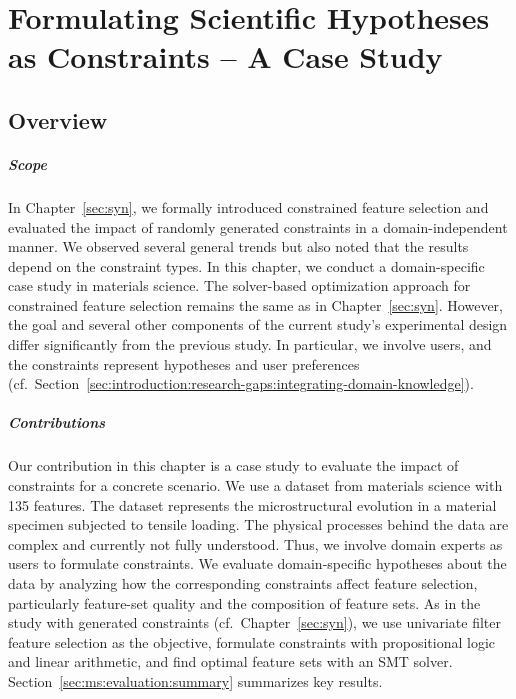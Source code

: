 \chapter{Formulating Scientific Hypotheses as Constraints -- A Case Study}
\label{sec:ms}

\section{Overview}
\label{sec:ms:overview}

\paragraph{Scope}

In Chapter~\ref{sec:syn}, we formally introduced constrained feature selection and evaluated the impact of randomly generated constraints in a domain-independent manner.
We observed several general trends but also noted that the results depend on the constraint types.
In this chapter, we conduct a domain-specific case study in materials science.
The solver-based optimization approach for constrained feature selection remains the same as in Chapter~\ref{sec:syn}.
However, the goal and several other components of the current study's experimental design differ significantly from the previous study.
In particular, we involve users, and the constraints represent hypotheses and user preferences (cf.~Section~\ref{sec:introduction:research-gaps:integrating-domain-knowledge}).

\paragraph{Contributions}

Our contribution in this chapter is a case study to evaluate the impact of constraints for a concrete scenario.
We use a dataset from materials science with 135 features.
The dataset represents the microstructural evolution in a material specimen subjected to tensile loading.
The physical processes behind the data are complex and currently not fully understood.
Thus, we involve domain experts as users to formulate constraints.
We evaluate domain-specific hypotheses about the data by analyzing how the corresponding constraints affect feature selection, particularly feature-set quality and the composition of feature sets.
As in the study with generated constraints (cf.~Chapter~\ref{sec:syn}), we use univariate filter feature selection as the objective, formulate constraints with propositional logic and linear arithmetic, and find optimal feature sets with an SMT solver.
Section~\ref{sec:ms:evaluation:summary} summarizes key results.

